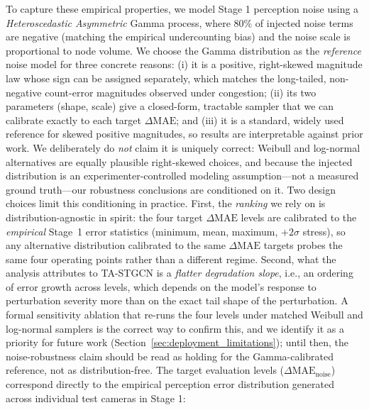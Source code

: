 \documentclass[journal,twocolumn]{IEEEtran}
\begin{document}
To capture these empirical properties, we model Stage 1 perception noise using a \emph{Heteroscedastic Asymmetric} Gamma process, where 80\% of injected noise terms are negative (matching the empirical undercounting bias) and the noise scale is proportional to node volume. We choose the Gamma distribution as the \emph{reference} noise model for three concrete reasons: (i) it is a positive, right-skewed magnitude law whose sign can be assigned separately, which matches the long-tailed, non-negative count-error magnitudes observed under congestion; (ii) its two parameters (shape, scale) give a closed-form, tractable sampler that we can calibrate exactly to each target $\Delta\text{MAE}$; and (iii) it is a standard, widely used reference for skewed positive magnitudes, so results are interpretable against prior work. We deliberately do \emph{not} claim it is uniquely correct: Weibull and log-normal alternatives are equally plausible right-skewed choices, and because the injected distribution is an experimenter-controlled modeling assumption---not a measured ground truth---our robustness conclusions are conditioned on it. Two design choices limit this conditioning in practice. First, the \emph{ranking} we rely on is distribution-agnostic in spirit: the four target $\Delta\text{MAE}$ levels are calibrated to the \emph{empirical} Stage~1 error statistics (minimum, mean, maximum, $+2\sigma$ stress), so any alternative distribution calibrated to the same $\Delta\text{MAE}$ targets probes the same four operating points rather than a different regime. Second, what the analysis attributes to TA-STGCN is a \emph{flatter degradation slope}, i.e., an ordering of error growth across levels, which depends on the model's response to perturbation severity more than on the exact tail shape of the perturbation. A formal sensitivity ablation that re-runs the four levels under matched Weibull and log-normal samplers is the correct way to confirm this, and we identify it as a priority for future work (Section~\ref{sec:deployment_limitations}); until then, the noise-robustness claim should be read as holding for the Gamma-calibrated reference, not as distribution-free. The target evaluation levels ($\Delta \text{MAE}_{\text{noise}}$) correspond directly to the empirical perception error distribution generated across individual test cameras in Stage 1:
\end{document}
